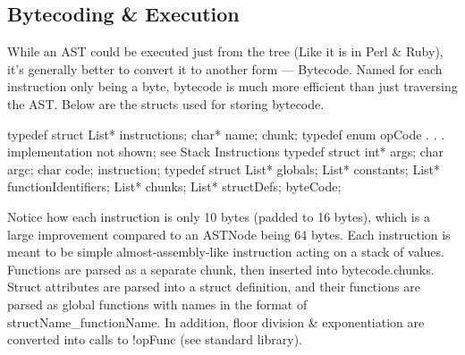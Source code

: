 \documentclass[12pt, letterpaper, oneside]{article}
\begin{document}
	\subsection{Bytecoding \& Execution}
	While an AST could be executed just from the tree (Like it is in Perl \& Ruby), it's generally better to convert it to another form --- Bytecode. Named for each instruction only being a byte, bytecode is much more efficient than just traversing the AST. Below are the structs used for storing bytecode.
	\begin{spverbatim}
		typedef struct {
			List* instructions;
			char* name;
		} chunk;
		typedef enum opCode {. . . implementation not shown; see Stack Instructions}
		typedef struct {
			int* args;
			char argc;
			char code;
		} instruction;
		typedef struct {
			List* globals;
			List* constants;
			List* functionIdentifiers;
			List* chunks;
			List* structDefs;
		} byteCode;
	\end{spverbatim}
	Notice how each instruction is only 10 bytes (padded to 16 bytes), which is a large improvement compared to an ASTNode being 64 bytes. Each \newline instruction is meant to be simple almost-assembly-like instruction acting on a stack of values. Functions are parsed as a separate chunk, then inserted into bytecode.chunks. Struct attributes are parsed into a struct definition, and their functions are parsed as global functions with names in the format of structName\_functionName.
	\newline
	In addition, floor division \& exponentiation are converted into calls to !opFunc (see standard library).
	\newpage
\end{document}
